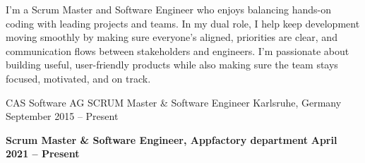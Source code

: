 \documentclass[10pt, a4paper]{cvhari}
\begin{document}

\makecvheader
\medskip



    \par
    I’m a Scrum Master and Software Engineer who enjoys balancing hands-on coding with leading projects and teams. In my dual role, I help keep development moving smoothly by making sure everyone’s aligned, priorities are clear, and communication flows between stakeholders and engineers. I’m passionate about building useful, user-friendly products while also making sure the team stays focused, motivated, and on track.
    \par
\medskip



    \company
        {CAS Software AG}
        {SCRUM Master \& Software Engineer}
        {Karlsruhe, Germany}
        {September 2015 -- Present}
    \vspace{0.5em}

    \textbf{Scrum Master \& Software Engineer, Appfactory department} \hfill \textbf{April 2021 -- Present}

    \vspace{0.2em}
\end{document}
